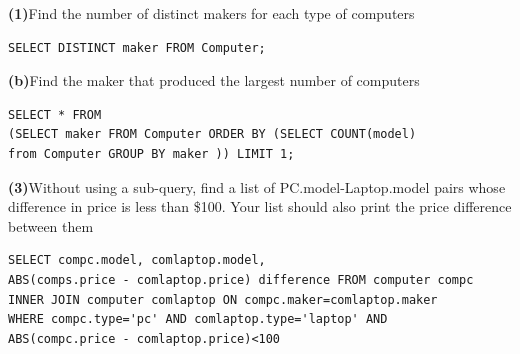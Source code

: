 \documentclass[a4paper, 11pt]{article}
\renewcommand{\part}[1] {\vspace{.10in} {\bf (#1)}}
\begin{document}
\part{1}{Find the number of distinct makers for each type of computers}\\
\begin{verbatim}
SELECT DISTINCT maker FROM Computer;
\end{verbatim} 
\part{b}{Find the maker that produced the largest number of computers}\\
\begin{verbatim}
SELECT * FROM 
(SELECT maker FROM Computer ORDER BY (SELECT COUNT(model) 
from Computer GROUP BY maker )) LIMIT 1;
\end{verbatim} 
\part{3}{Without using a sub-query, find a list of PC.model-Laptop.model pairs whose difference in price is less than \$100. Your list should also print the price difference between them}\\
\begin{verbatim}
SELECT compc.model, comlaptop.model,
ABS(comps.price - comlaptop.price) difference FROM computer compc 
INNER JOIN computer comlaptop ON compc.maker=comlaptop.maker
WHERE compc.type='pc' AND comlaptop.type='laptop' AND 
ABS(compc.price - comlaptop.price)<100
\end{verbatim}
\end{document}
